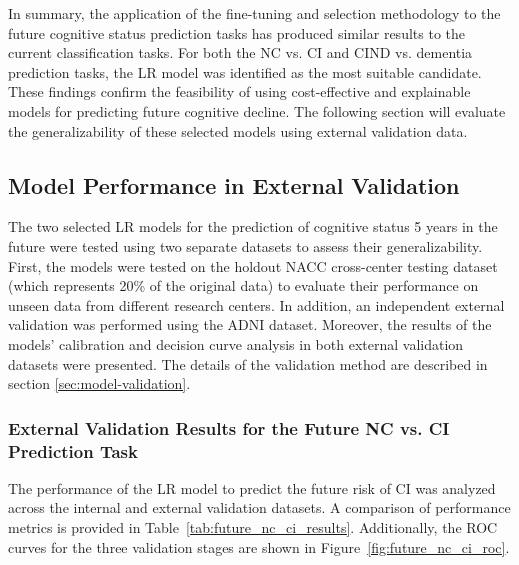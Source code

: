 In summary, the application of the fine-tuning and selection methodology to the future cognitive status prediction tasks has produced similar results to the current classification tasks. For both the NC vs. CI and CIND vs. dementia prediction tasks, the LR model was identified as the most suitable candidate. These findings confirm the feasibility of using cost-effective and explainable models for predicting future cognitive decline. The following section will evaluate the generalizability of these selected models using external validation data.

\subsection{Model Performance in External Validation}
The two selected LR models for the prediction of cognitive status 5 years in the future were tested using two separate datasets to assess their generalizability. First, the models were tested on the holdout NACC cross-center testing dataset (which represents 20\% of the original data) to evaluate their performance on unseen data from different research centers. In addition, an independent external validation was performed using the ADNI dataset. Moreover, the results of the models' calibration and decision curve analysis in both external validation datasets were presented. The details of the validation method are described in section \ref{sec:model-validation}.

\subsubsection{External Validation Results for the Future NC vs. CI Prediction Task}
The performance of the LR model to predict the future risk of CI was analyzed across the internal and external validation datasets. A comparison of performance metrics is provided in Table~\ref{tab:future_nc_ci_results}. Additionally, the ROC curves for the three validation stages are shown in Figure~\ref{fig:future_nc_ci_roc}.

